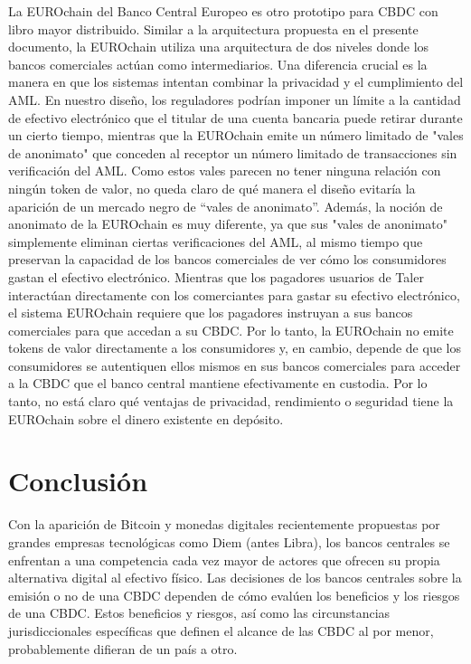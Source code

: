 \documentclass[10pt,spanish]{article}
\begin{document}
La EUROchain del Banco Central Europeo\cite[véase][]{ECB} es otro
prototipo para CBDC con libro mayor distribuido. Similar a la
arquitectura propuesta en el presente documento, la EUROchain utiliza
una arquitectura de dos niveles donde los bancos comerciales actúan como
intermediarios. Una diferencia crucial es la manera en que los sistemas
intentan combinar la privacidad y el cumplimiento del AML. En nuestro
diseño, los reguladores podrían imponer un límite a la cantidad de
efectivo electrónico que el titular de una cuenta bancaria puede retirar
durante un cierto tiempo, mientras que la EUROchain emite un número
limitado de "vales de anonimato" que conceden al receptor un número
limitado de transacciones sin verificación del AML. Como estos vales
parecen no tener ninguna relación con ningún token de valor, no queda
claro de qué manera el diseño evitaría la aparición de un mercado negro
de ``vales de anonimato''. Además, la noción de anonimato de la
EUROchain es muy diferente, ya que sus "vales de anonimato" simplemente
eliminan ciertas verificaciones del AML, al mismo tiempo que preservan
la capacidad de los bancos comerciales de ver cómo los consumidores
gastan el efectivo electrónico. Mientras que los pagadores usuarios de
Taler interactúan directamente con los comerciantes para gastar su
efectivo electrónico, el sistema EUROchain requiere que los pagadores
instruyan a sus bancos comerciales para que accedan a su CBDC. Por lo
tanto, la EUROchain no emite tokens de valor directamente a los
consumidores y, en cambio, depende de que los consumidores se
autentiquen ellos mismos en sus bancos comerciales para acceder a la
CBDC que el banco central mantiene efectivamente en custodia. Por lo
tanto, no está claro qué ventajas de privacidad, rendimiento o seguridad
tiene la EUROchain sobre el dinero existente en depósito.

\hypertarget{conclusiuxf3n}{%
\section{Conclusión}
\label{7.-conclusiuxf3n}}

Con la aparición de Bitcoin y monedas digitales recientemente propuestas
por grandes empresas tecnológicas como Diem (antes Libra), los bancos
centrales se enfrentan a una competencia cada vez mayor de actores que
ofrecen su propia alternativa digital al efectivo físico. Las decisiones
de los bancos centrales sobre la emisión o no de una CBDC dependen de
cómo evalúen los beneficios y los riesgos de una CBDC. Estos beneficios
y riesgos, así como las circunstancias jurisdiccionales específicas que
definen el alcance de las CBDC al por menor, probablemente difieran de
un país a otro.
\end{document}
